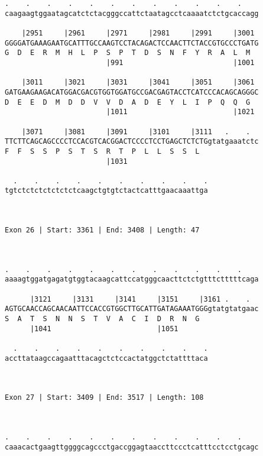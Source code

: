 \documentclass{article}
\begin{document}
{\begin{Verbatim}
.    .    .    .    .    .    .    .    .    .    .    .    
caagaagtggaatagcatctctacgggccattctaatagcctcaaaatctctgcaccagg
                                                            
    |2951     |2961     |2971     |2981     |2991     |3001 
GGGGATGAAAGAATGCATTTGCCAAGTCCTACAGACTCCAACTTCTACCGTGCCCTGATG
G  D  E  R  M  H  L  P  S  P  T  D  S  N  F  Y  R  A  L  M  
                        |991                          |1001 
  
    |3011     |3021     |3031     |3041     |3051     |3061 
GATGAAGAAGACATGGACGACGTGGTGGATGCCGACGAGTACCTCATCCCACAGCAGGGC
D  E  E  D  M  D  D  V  V  D  A  D  E  Y  L  I  P  Q  Q  G  
                        |1011                         |1021 
  
    |3071     |3081     |3091     |3101     |3111   .    .  
TTCTTCAGCAGCCCCTCCACGTCACGGACTCCCCTCCTGAGCTCTCTGgtatgaaatctc
F  F  S  S  P  S  T  S  R  T  P  L  L  S  S  L              
                        |1031                               
  
  .    .    .    .    .    .    .    .    .    .
tgtctctctctctctctcaagctgtgtctactcatttgaacaaattga
                                                
                                                
 
Exon 26 | Start: 3361 | End: 3408 | Length: 47



.    .    .    .    .    .    .    .    .    .    .    .    
aaaagtggatgagatgtggtacaagcattccatgggcaacttctctgtttctttttcaga
                                                            
      |3121     |3131     |3141     |3151     |3161 .    .  
AGTGCAACCAGCAACAATTCCACCGTGGCTTGCATTGATAGAAATGGGgtatgtatgaac
S  A  T  S  N  N  S  T  V  A  C  I  D  R  N  G              
      |1041                         |1051                   
  
  .    .    .    .    .    .    .    .    .    .
accttataagccagaatttacagctctccactatggctctattttaca
                                                
                                                
 
Exon 27 | Start: 3409 | End: 3517 | Length: 108



.    .    .    .    .    .    .    .    .    .    .    .    
caaacactgaagttggggcagccctgaccggagtaaccttccctcatttcctcctgcagc
                                                            

\end{Verbatim}}
\end{document}
